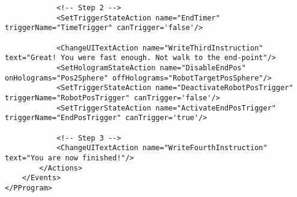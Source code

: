 \begin{lstlisting}
			<!-- Step 2 -->
			<SetTriggerStateAction name="EndTimer" triggerName="TimeTrigger" canTrigger='false'/>
			
			<ChangeUITextAction name="WriteThirdInstruction" text="Great! You were fast enough. Not walk to the end-point"/>
			<SetHologramStateAction name="DisableEndPos" onHolograms="Pos2Sphere" offHolograms="RobotTargetPosSphere"/>
			<SetTriggerStateAction name="DeactivateRobotPosTrigger" triggerName="RobotPosTrigger" canTrigger='false'/>
			<SetTriggerStateAction name="ActivateEndPosTrigger" triggerName="EndPosTrigger" canTrigger='true'/>
			
			<!-- Step 3 -->
			<ChangeUITextAction name="WriteFourthInstruction" text="You are now finished!"/>
		</Actions>
	</Events>
</PProgram>

\end{lstlisting}